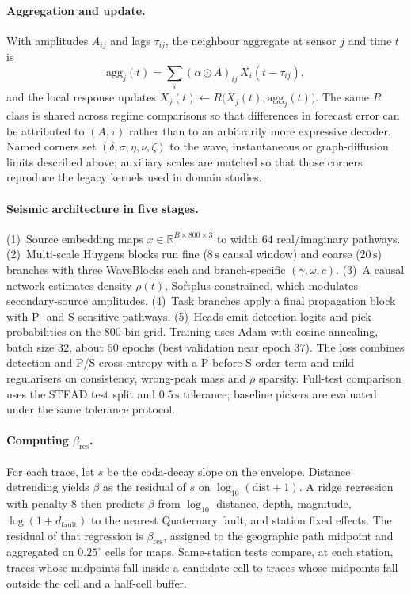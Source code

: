 \documentclass[twocolumn,10pt]{article}
\newcommand{\stead}{\textsc{STEAD}}
\begin{document}
\paragraph{Aggregation and update.}
With amplitudes \(A_{ij}\) and lags \(\tau_{ij}\), the neighbour aggregate at
sensor \(j\) and time \(t\) is
\[
\mathrm{agg}_j(t)=\sum_i (\alpha\odot A)_{ij}\, X_i(t-\tau_{ij}),
\]
and the local response updates \(X_j(t)\leftarrow R\big(X_j(t),\mathrm{agg}_j(t)\big)\).
The same \(R\) class is shared across regime comparisons so that differences in
forecast error can be attributed to \((A,\tau)\) rather than to an arbitrarily
more expressive decoder. Named corners set \((\delta,\sigma,\eta,\nu,\zeta)\) to
the wave, instantaneous or graph-diffusion limits described above; auxiliary
scales are matched so that those corners reproduce the legacy kernels used in
domain studies.

\paragraph{Seismic architecture in five stages.}
(1)~Source embedding maps \(x\in\mathbb{R}^{B\times800\times3}\) to width \(64\)
real/imaginary pathways. (2)~Multi-scale Huygens blocks run fine
(\(8\,\mathrm{s}\) causal window) and coarse (\(20\,\mathrm{s}\)) branches with
three WaveBlocks each and branch-specific \((\gamma,\omega,c)\).
(3)~A causal network estimates density \(\rho(t)\), Softplus-constrained, which
modulates secondary-source amplitudes. (4)~Task branches apply a final
propagation block with P- and S-sensitive pathways. (5)~Heads emit detection
logits and pick probabilities on the \(800\)-bin grid. Training uses Adam with
cosine annealing, batch size \(32\), about \(50\) epochs (best validation near
epoch \(37\)). The loss combines detection and P/S cross-entropy with a
P-before-S order term and mild regularisers on consistency, wrong-peak mass and
\(\rho\) sparsity. Full-test comparison uses the \stead{} test split and
\(0.5\,\mathrm{s}\) tolerance; baseline pickers are evaluated under the same
tolerance protocol.

\paragraph{Computing \(\beta_{\mathrm{res}}\).}
For each trace, let \(s\) be the coda-decay slope on the envelope. Distance
detrending yields \(\beta\) as the residual of \(s\) on
\(\log_{10}(\mathrm{dist}+1)\). A ridge regression with penalty \(8\) then
predicts \(\beta\) from \(\log_{10}\) distance, depth, magnitude,
\(\log(1+d_{\mathrm{fault}})\) to the nearest Quaternary fault, and station
fixed effects. The residual of that regression is \(\beta_{\mathrm{res}}\),
assigned to the geographic path midpoint and aggregated on \(0.25^\circ\) cells
for maps. Same-station tests compare, at each station, traces whose midpoints
fall inside a candidate cell to traces whose midpoints fall outside the cell and
a half-cell buffer.
\end{document}
